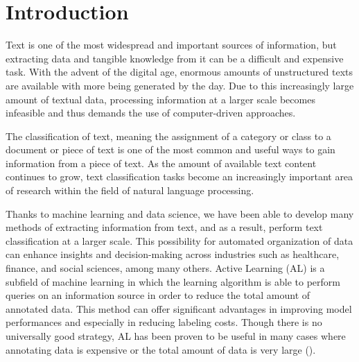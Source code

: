 \documentclass[english,bachelor,lu]{webisthesis} %
\begin{document}
\begin{frontmatter}
\begin{abstract}
This is the \LaTeX{} template for Bachelor and Master theses at Webis. This template contains several hints and conventions on how to structure a thesis, how to cite the work of others, and how to display your results besides plain text. 
\end{abstract}
\end{frontmatter}

\tableofcontents

\chapter{Introduction}

Text is one of the most widespread and important sources of information, but extracting data and tangible knowledge from it can be a difficult and expensive task. With the advent of the digital age, enormous amounts of unstructured texts are available with more being generated by the day. Due to this increasingly large amount of textual data, processing information at a larger scale becomes infeasible and thus demands the use of computer-driven approaches. 

The classification of text, meaning the assignment of a category or class to a document or piece of text is one of the most common and useful ways to gain information from a piece of text. As the amount of available text content continues to grow, text classification tasks become an increasingly important area of research within the field of natural language processing. 

Thanks to machine learning and data science, we have been able to develop many methods of extracting information from text, and as a result, perform text classification at a larger scale. This possibility for automated organization of data can enhance insights and decision-making across industries such as healthcare, finance, and social sciences, among many others. Active Learning (AL) is a subfield of machine learning in which the learning algorithm is able to perform queries on an information source in order to reduce the total amount of annotated data. This method can offer significant advantages in improving model performances and especially in reducing labeling costs. Though there is no universally good strategy, AL has been proven to be useful in many cases where annotating data is expensive or the total amount of data is very large (\cite{settles.tr09}). 
\end{document}

